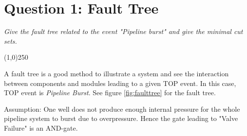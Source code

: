 \section{Question 1: Fault Tree}
\textit{Give the fault tree related	to the event "Pipeline burst" and give the minimal cut sets.}
\begin{center}
\line(1,0){250}
\end{center}
A fault tree is a good method to illustrate a system and see the interaction between components and modules leading to a given TOP event. In this case, TOP event is \textit{Pipeline Burst}. See figure \ref{fig:faulttree} for the fault tree.

Assumption:
One well does not produce enough internal pressure for the whole pipeline system to burst due to overpressure. Hence the gate leading to "Valve Failure" is an AND-gate.

